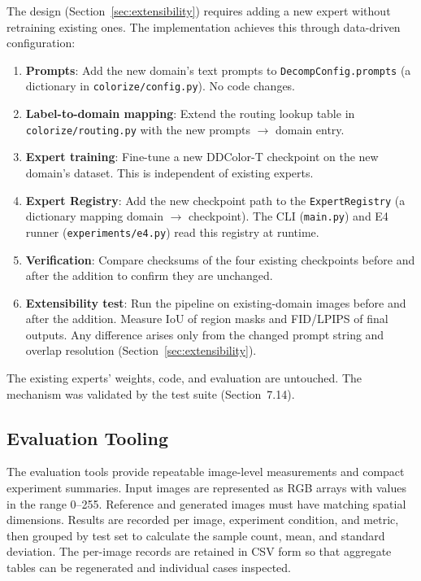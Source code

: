 \documentclass{FastFyp}
\begin{document}
The design (Section~\ref{sec:extensibility}) requires adding a new expert without retraining existing ones. The implementation achieves this through data-driven configuration:

\begin{enumerate}
    \item \textbf{Prompts}: Add the new domain's text prompts to \texttt{DecompConfig.prompts} (a dictionary in \texttt{colorize/config.py}). No code changes.
    \item \textbf{Label-to-domain mapping}: Extend the routing lookup table in \texttt{colorize/routing.py} with the new prompts $\to$ domain entry.
    \item \textbf{Expert training}: Fine-tune a new DDColor-T checkpoint on the new domain's dataset. This is independent of existing experts.
    \item \textbf{Expert Registry}: Add the new checkpoint path to the \texttt{ExpertRegistry} (a dictionary mapping domain $\to$ checkpoint). The CLI (\texttt{main.py}) and E4 runner (\texttt{experiments/e4.py}) read this registry at runtime.
    \item \textbf{Verification}: Compare checksums of the four existing checkpoints before and after the addition to confirm they are unchanged.
    \item \textbf{Extensibility test}: Run the pipeline on existing-domain images before and after the addition. Measure IoU of region masks and FID/LPIPS of final outputs. Any difference arises only from the changed prompt string and overlap resolution (Section~\ref{sec:extensibility}).
\end{enumerate}
The existing experts' weights, code, and evaluation are untouched. The mechanism was validated by the test suite (Section~7.14).

\subsection{Evaluation Tooling}
\label{subsec:evaluation-tooling}

The evaluation tools provide repeatable image-level measurements and compact
experiment summaries. Input images are represented as RGB arrays with values
in the range 0--255. Reference and generated images must have matching spatial
dimensions. Results are recorded per image, experiment condition, and metric,
then grouped by test set to calculate the sample count, mean, and standard
deviation. The per-image records are retained in CSV form so that aggregate
tables can be regenerated and individual cases inspected.
\end{document}

